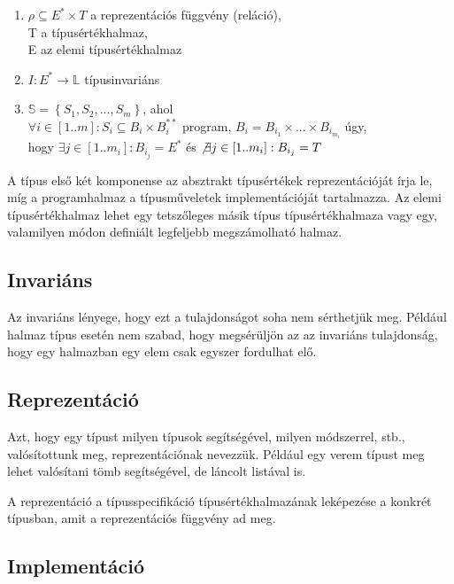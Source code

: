 \documentclass[margin=0px]{article}
\begin{document}
\begin{enumerate}
    \item $\rho \subseteq E^{*} \times T$ a reprezentációs függvény (reláció),\\
          T a típusértékhalmaz,\\
          E az elemi típusértékhalmaz
    \item $I : E^{*} \to \mathbb{L} $ típusinvariáns
    \item $\mathbb{S} = \left\{ {S_{1},S_{2},...,S_{m}}\right\}$, ahol\\
          $\forall i \in [1..m]: S_{i} \subseteq B_{i} \times B_{i}^{**}$ program, $B_{i} = B_{i_{1}} \times ... \times B_{i_{m_{i}}}$ úgy,\\
          hogy $\exists j \in [1..m_{i}]: B_{i_{j}} = E^{*}$ és $\not \exists j \in [1..m_{i}]: B_{i_{j}} = T$
\end{enumerate}

A típus első két komponense az absztrakt típusértékek reprezentációját írja le, míg a programhalmaz a típusműveletek implementációját tartalmazza. Az elemi típusértékhalmaz lehet egy tetszőleges másik típus típusértékhalmaza vagy egy, valamilyen módon definiált legfeljebb megszámolható halmaz.

\subsection{Invariáns}

Az invariáns lényege, hogy ezt a tulajdonságot soha nem sérthetjük meg. Például halmaz típus esetén nem szabad, hogy megsérüljön
az az invariáns tulajdonság, hogy egy halmazban egy elem csak egyszer fordulhat elő.

\subsection{Reprezentáció}

Azt, hogy egy típust milyen típusok segítségével, milyen módszerrel, stb., valósítottunk meg, reprezentációnak nevezzük. Például
egy verem típust meg lehet valósítani tömb segítségével, de láncolt listával is.

A reprezentáció a típusspecifikáció típusértékhalmazának leképezése a konkrét típusban, amit a reprezentációs függvény ad meg.

\subsection{Implementáció}
\end{document}
